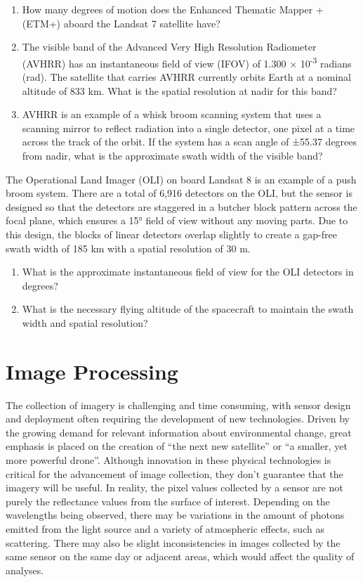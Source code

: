 \documentclass[
]{book}
\providecommand{\tightlist}{%
  \setlength{\itemsep}{0pt}\setlength{\parskip}{0pt}}
\begin{document}
\begin{enumerate}
\def\labelenumi{\arabic{enumi}.}
\tightlist
\item
  How many degrees of motion does the Enhanced Thematic Mapper + (ETM+) aboard the Landsat 7 satellite have?
\item
  The visible band of the Advanced Very High Resolution Radiometer (AVHRR) has an instantaneous field of view (IFOV) of 1.300 × 10\textsuperscript{-3} radians (rad). The satellite that carries AVHRR currently orbits Earth at a nominal altitude of 833 km. What is the spatial resolution at nadir for this band?
\item
  AVHRR is an example of a whisk broom scanning system that uses a scanning mirror to reflect radiation into a single detector, one pixel at a time across the track of the orbit. If the system has a scan angle of ±55.37 degrees from nadir, what is the approximate swath width of the visible band?
\end{enumerate}

The Operational Land Imager (OLI) on board Landsat 8 is an example of a push broom system. There are a total of 6,916 detectors on the OLI, but the sensor is designed so that the detectors are staggered in a butcher block pattern across the focal plane, which ensures a 15° field of view without any moving parts. Due to this design, the blocks of linear detectors overlap slightly to create a gap-free swath width of 185 km with a spatial resolution of 30 m.

\begin{enumerate}
\def\labelenumi{\arabic{enumi}.}
\setcounter{enumi}{3}
\tightlist
\item
  What is the approximate instantaneous field of view for the OLI detectors in degrees?
\item
  What is the necessary flying altitude of the spacecraft to maintain the swath width and spatial resolution?
\end{enumerate}

\hypertarget{image-processing}{%
\chapter{Image Processing}\label{image-processing}}

The collection of imagery is challenging and time consuming, with sensor
design and deployment often requiring the development of new
technologies. Driven by the growing demand for relevant information
about environmental change, great emphasis is placed on the creation of
``the next new satellite'' or ``a smaller, yet more powerful drone''.
Although innovation in these physical technologies is critical for the
advancement of image collection, they don't guarantee that the imagery
will be useful. In reality, the pixel values collected by a sensor are
not purely the reflectance values from the surface of interest.
Depending on the wavelengths being observed, there may be variations in
the amount of photons emitted from the light source and a variety of
atmospheric effects, such as scattering. There may also be slight
inconsistencies in images collected by the same sensor on the same day
or adjacent areas, which would affect the quality of analyses.
\end{document}
